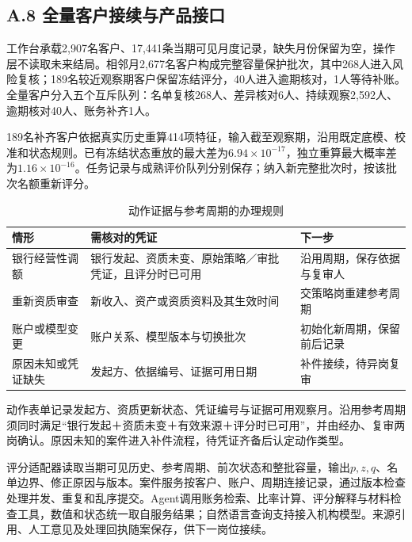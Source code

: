 
\clearpage\subsection*{A.8 全量客户接续与产品接口}
工作台承载2,907名客户、17,441条当期可见月度记录，缺失月份保留为空，操作层不读取未来结局。相邻月2,677名客户构成完整容量保护批次，其中268人进入风险复核；189名较近观察期客户保留冻结评分，40人进入逾期核对，1人等待补账。全量客户分入五个互斥队列：名单复核268人、差异核对6人、持续观察2,592人、逾期核对40人、账务补齐1人。

189名补齐客户依据真实历史重算414项特征，输入截至观察期，沿用既定底模、校准和状态规则。已有冻结状态重放的最大差为$6.94\times10^{-17}$，独立重算最大概率差为$1.16\times10^{-16}$。任务记录与成熟评价队列分别保存；纳入新完整批次时，按该批次名额重新评分。

\begin{table}[H]\centering\caption{动作证据与参考周期的办理规则}\small
\begin{tabularx}{\linewidth}{@{}p{28mm}YY@{}}\toprule
情形 & 需核对的凭证 & 下一步\\\midrule
银行经营性调额 & 银行发起、资质未变、原始策略／审批凭证，且评分时已可用 & 沿用周期，保存依据与复审人\\
重新资质审查 & 新收入、资产或资质资料及其生效时间 & 交策略岗重建参考周期\\
账户或模型变更 & 账户关系、模型版本与切换批次 & 初始化新周期，保留前后记录\\
原因未知或凭证缺失 & 发起方、依据编号、证据可用日期 & 补件接续，待异岗复审\\\bottomrule
\end{tabularx}\end{table}

动作表单记录发起方、资质更新状态、凭证编号与证据可用观察月。沿用参考周期须同时满足“银行发起＋资质未变＋有效来源＋评分时已可用”，并由经办、复审两岗确认。原因未知的案件进入补件流程，待凭证齐备后认定动作类型。

评分适配器读取当期可见历史、参考周期、前次状态和整批容量，输出$p,z,q$、名单边界、修正原因与版本。案件服务按客户、账户、周期连接记录，通过版本检查处理并发、重复和乱序提交。Agent调用账务检索、比率计算、评分解释与材料检查工具，数值和状态统一取自服务结果；自然语言查询支持接入机构模型。来源引用、人工意见及处理回执随案保存，供下一岗位接续。

